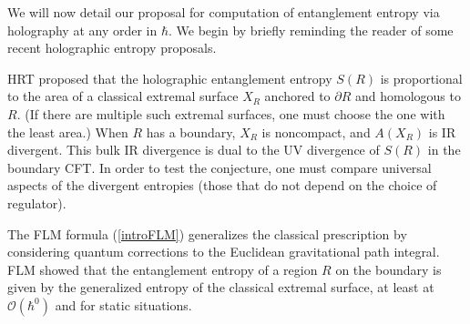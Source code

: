 \documentclass[12pt]{article}
\theoremstyle{remark}
\numberwithin{equation}{section}
\numberwithin{equation}{section}
\begin{document}
We will now detail our proposal for computation of entanglement entropy via holography at any order in $\hbar$. We begin by briefly reminding the reader of some recent holographic entropy proposals. 

HRT proposed that the holographic entanglement entropy $S(R)$ is proportional to the area of a classical extremal surface $X_R$ anchored to $\partial R$ and homologous to $R$.  (If there are multiple such extremal surfaces, one must choose the one with the least area.)  When $R$ has a boundary, $X_R$ is noncompact, and $A(X_R)$ is IR divergent.  This bulk IR divergence is dual to the UV divergence of $S(R)$ in the boundary CFT.  In order to test the conjecture, one must compare universal aspects of the divergent entropies (those that do not depend on the choice of regulator).

The FLM formula (\ref{introFLM}) generalizes the classical prescription by considering quantum corrections to the Euclidean gravitational path integral.  FLM showed that the entanglement entropy of a region $R$ on the boundary is given by the generalized entropy of the classical extremal surface, at least at $\mathcal{O}(\hbar^{0})$ and for static situations.
\end{document}
